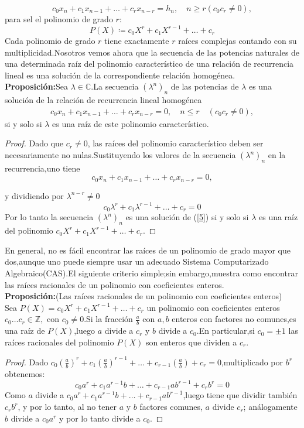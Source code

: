 $$
c_{0}x_{n}+c_{1}x_{n-1}+\ldots+c_{r}x_{n-r}=h_{n}, \quad n \geq r (c_{0}c_{r}\neq 0),
$$
para sel el polinomio de grado $ r $:
$$
P(X) \coloneq c_{0}X^{r}+c_{1}X^{r-1}+\ldots+c_{r}
$$
Cada polinomio de grado $ r $ tiene exactamente $ r $ raíces complejas contando con su multiplicidad.Nosotros vemos ahora que la secuencia de las potencias naturales de una determinada raíz del polinomio característico de una relación de recurrencia lineal es una solución de la correspondiente relación homogénea.\\
{\bf Proposición:}Sea $ \lambda \in  \mathbb{C} $.La secuencia $ (\lambda^{n})_{n} $ de las potencias de $ \lambda $ es una solución de la relación de recurrencia lineal homogénea
\begin{align}\label{5}
c_{0}x_{n}+c_{1}x_{n-1}+\ldots+c_{r}x_{n-r}=0,\quad n\leq r \quad (c_{0}c_{r}\neq 0),
\end{align}
si y solo si $ \lambda $ es una raíz de este polinomio característico.
\begin{proof}
	Dado que $ c_{r}\neq 0 $, las raíces del polinomio característico deben ser necesariamente no nulas.Sustituyendo los valores de la secuencia $ (\lambda^{n})_{n} $ en la recurrencia,uno tiene
	$$
	c_{0}x_{n}+c_{1}x_{n-1}+\ldots+c_{r}x_{n-r}=0,
	$$
	
	y dividiendo por $ \lambda^{n-r}\neq 0$
	$$
	c_{0}\lambda^{r}+c_{1}\lambda^{r-1}+\ldots+c_{r}=0
	$$
	Por lo tanto la secuencia $ (\lambda^{n})_{n} $ es una solución de (\ref{5}) si y solo si $ \lambda $ es una raíz del polinomio $c_{0}X^{r}+c_{1}X^{r-1}+\ldots+c_{r}  .$
\end{proof}
En general, no es fácil encontrar las raíces de un polinomio de grado mayor que dos,aunque uno puede siempre usar un adecuado Sistema Computarizado Algebraico(CAS).El siguiente criterio simple;sin embargo,muestra como encontrar las raíces racionales de un polinomio con coeficientes enteros.\\
{\bf Proposición:}(Las raíces racionales de un polinomio con coeficientes enteros)\\
Sea $ P(X)=c_{0}X^{r}+c_{1}X^{r-1}+\ldots+c_{r}$ un polinomio con coeficientes enteros $ c_{0}\ldots c_{r} \in \mathbb{Z}, $ con $ c_{0}\neq 0 $.Si la fracción $\frac{a}{b} $ con $ a,b $ enteros con factores no comunes,es una raíz de $ P(X) $,luego $ a $ divide a $ c_{r} $
y $ b $ divide a $ c_{0} $.En particular,si $ c_{0}=\pm 1 $ las raíces racionales del polinomio $ P(X) $ son enteros que dividen a $ c_{r} .$
\begin{proof}
	Dado $ c_{0}\left(\frac{a}{b}\right)^{r} + c_{1}\left( \frac{a}{b}\right )^{r-1} + \ldots + c_{r-1}\left (\frac{a}{b}\right)+c_{r}=0 $,multiplicado por $ b^{r} $ obtenemos:
	$$
	c_{0}a^{r}+c_{1}a^{r-1}b+\ldots+c_{r-1}ab^{r-1}+c_{r}b^{r}=0
	$$
	Como $ a $ divide a $c_{0}a^{r}+c_{1}a^{r-1}b+\ldots+c_{r-1}ab^{r-1}  $,luego tiene que dividir también $ c_{r}b^{r} $, y por lo tanto, al no tener $ a $ y $ b $ factores comunes, $ a $ divide $ c_{r} $; análogamente $ b $ divide a $ c_{0}a^{r} $ y por lo tanto divide a $ c_{0} $.
\end{proof}
